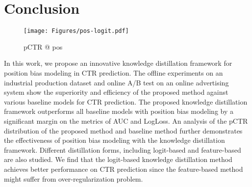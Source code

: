 \documentclass[sigconf,natbib=true,anonymous=false]{acmart}
\begin{document}
\section{Conclusion}
\label{sec:conclusion}
\begin{figure}[!t]
  \texttt{[image: Figures/pos-logit.pdf]}
  \caption{pCTR @ pos}
  \label{fig:ctr}
\end{figure}
In this work, we propose an innovative knowledge distillation framework for position bias modeling in CTR prediction.
The offline experiments on an industrial production dataset and online A/B test on an online advertising system show the superiority and efficiency of the proposed method against various baseline models for CTR prediction.
The proposed knowledge distillation framework outperforms all baseline models with position bias modeling by a significant margin on the metrics of AUC and LogLoss.
An analysis of the pCTR distribution of the proposed method and baseline method further demonstrates the effectiveness of position bias modeling with the knowledge distillation framework.
Different distillation forms, including logit-based and feature-based are also studied.
We find that the logit-based knowledge distillation method achieves better performance on CTR prediction since the feature-based method might suffer from over-regularization problem.








\end{document}

